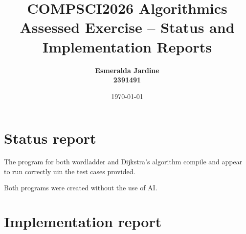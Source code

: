 \documentclass{article}
\title{COMPSCI2026 Algorithmics \\ \vspace{4mm} 
 Assessed Exercise -- Status and Implementation Reports}
\author{\bf Esmeralda Jardine\\ \bf 2391491}
\date{\today}
\begin{document}
 
\maketitle

\section*{Status report}

The program for both wordladder and Dijkstra's algorithm compile and appear to run correctly uin the test cases provided. 

Both programs were created without the use of AI.
\section*{Implementation report}
\end{document}
